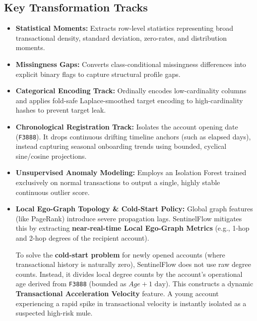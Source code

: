 \documentclass[11pt,a4paper]{article}
\begin{document}
\subsection*{Key Transformation Tracks}
\begin{itemize}
  \item \textbf{Statistical Moments:} Extracts row-level statistics representing broad transactional density, standard deviation, zero-rates, and distribution moments.
  \item \textbf{Missingness Gaps:} Converts class-conditional missingness differences into explicit binary flags to capture structural profile gaps.
  \item \textbf{Categorical Encoding Track:} Ordinally encodes low-cardinality columns and applies fold-safe Laplace-smoothed target encoding to high-cardinality hashes to prevent target leak.
  \item \textbf{Chronological Registration Track:} Isolates the account opening date (\texttt{F3888}). It drops continuous drifting timeline anchors (such as elapsed days), instead capturing seasonal onboarding trends using bounded, cyclical sine/cosine projections.
  \item \textbf{Unsupervised Anomaly Modeling:} Employs an Isolation Forest trained exclusively on normal transactions to output a single, highly stable continuous outlier score.
  \item \textbf{Local Ego-Graph Topology \& Cold-Start Policy:} Global graph features (like PageRank) introduce severe propagation lags. SentinelFlow mitigates this by extracting \textbf{near-real-time Local Ego-Graph Metrics} (e.g., 1-hop and 2-hop degrees of the recipient account). 
  
  To solve the \textbf{cold-start problem} for newly opened accounts (where transactional history is naturally zero), SentinelFlow does not use raw degree counts. Instead, it divides local degree counts by the account's operational age derived from \texttt{F3888} (bounded as $Age + 1\text{ day}$). This constructs a dynamic \textbf{Transactional Acceleration Velocity} feature. A young account experiencing a rapid spike in transactional velocity is instantly isolated as a suspected high-risk mule.
\end{itemize}
\end{document}
